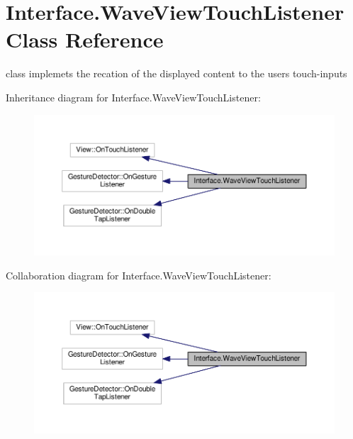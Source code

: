 \hypertarget{classInterface_1_1WaveViewTouchListener}{}\section{Interface.\+Wave\+View\+Touch\+Listener Class Reference}
\label{classInterface_1_1WaveViewTouchListener}


class implemets the recation of the displayed content to the users touch-\/inputs  




Inheritance diagram for Interface.\+Wave\+View\+Touch\+Listener\+:
\nopagebreak
\begin{figure}[H]
\begin{center}
\leavevmode
\includegraphics[width=350pt]{classInterface_1_1WaveViewTouchListener__inherit__graph}
\end{center}
\end{figure}


Collaboration diagram for Interface.\+Wave\+View\+Touch\+Listener\+:
\nopagebreak
\begin{figure}[H]
\begin{center}
\leavevmode
\includegraphics[width=350pt]{classInterface_1_1WaveViewTouchListener__coll__graph}
\end{center}
\end{figure}
